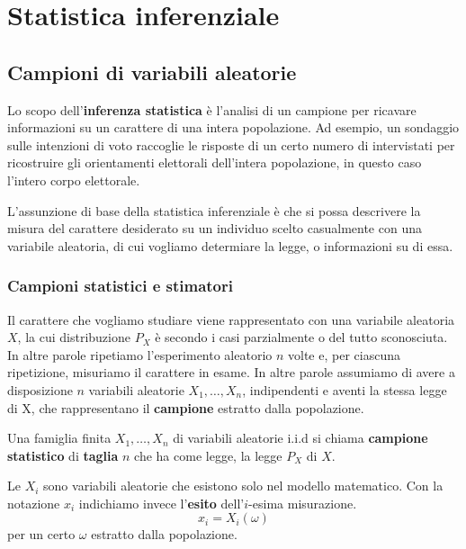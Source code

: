 \part{Statistica inferenziale}

\chapter{Campioni di variabili aleatorie}
Lo scopo dell’\textbf{inferenza statistica} è l'analisi di un campione per ricavare informazioni
su un carattere di una intera popolazione. Ad esempio, un sondaggio sulle intenzioni di voto
raccoglie le risposte di un certo numero di intervistati per ricostruire gli orientamenti
elettorali dell’intera popolazione, in questo caso l’intero corpo elettorale.

L’assunzione di base della statistica inferenziale è che si possa descrivere la misura del carattere
desiderato su un individuo scelto casualmente con una variabile aleatoria, di cui vogliamo
determiare la legge, o informazioni su di essa.

\section{Campioni statistici e stimatori}
Il carattere che vogliamo studiare viene rappresentato con una variabile aleatoria
$X$, la cui distribuzione $P_X$ è secondo i casi parzialmente o del tutto sconosciuta. In altre
parole ripetiamo l'esperimento aleatorio $n$ volte e, per ciascuna ripetizione, misuriamo il
carattere in esame. In altre parole assumiamo di avere a disposizione $n$ variabili aleatorie
$X_1, \dots, X_n$, indipendenti e aventi la stessa legge di X, che rappresentano il
\textbf{campione} estratto dalla popolazione.

\begin{definition}\label{def: campione statistico}
	Una famiglia finita $X_1, \dots, X_n$ di variabili aleatorie i.i.d si chiama
	\textbf{campione statistico} di \textbf{taglia} $n$ che ha come legge, la legge $P_X$ di $X$.
\end{definition}

\begin{observation}
	Le $X_i$ sono variabili aleatorie che esistono solo nel modello matematico. Con la notazione
	$x_i$ indichiamo invece l'\textbf{esito} dell'$i$-esima misurazione.
	\[ x_i = X_i(\omega) \]
	per un certo $\omega$ estratto dalla popolazione.
\end{observation}

